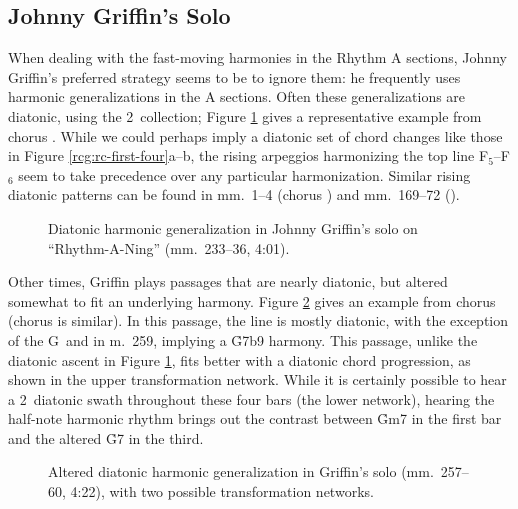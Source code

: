 \subsection{Johnny Griffin’s Solo}
\FloatBarrier

When dealing with the fast-moving harmonies in the Rhythm A sections, Johnny
Griffin's preferred strategy seems to be to ignore them: he frequently uses
harmonic generalizations in the A sections. Often these generalizations are
diatonic, using the 2\flat\ collection; Figure \ref{ran:jg-diatonic-gen} gives
a representative example from chorus . While we could perhaps imply
a diatonic set of chord changes like those in Figure
\ref{rcg:rc-first-four}a--b, the rising arpeggios harmonizing the top line
F$_5$--F$_6$ seem to take precedence over any particular harmonization.
Similar rising diatonic patterns can be found in mm.~1--4 (chorus )
and mm.~169--72 ().

\begin{figure}[tbp]
  \caption[Diatonic harmonic generalization in Johnny Griffin's solo on
    ``Rhythm-A-Ning.'']{Diatonic harmonic generalization in Johnny Griffin's
    solo on ``Rhythm-A-Ning'' (mm.~233--36, 4:01).}
  \label{ran:jg-diatonic-gen}
\end{figure}

Other times, Griffin plays passages that are nearly diatonic, but altered
somewhat to fit an underlying harmony. Figure \ref{ran:jg-diatonic-alt} gives
an example from chorus  (chorus  is similar). In this
passage, the line is mostly diatonic, with the exception of the G\nat\ and
\Aflat in m.~259, implying a \h{G7b9} harmony. This passage, unlike the
diatonic ascent in Figure \ref{ran:jg-diatonic-gen}, fits better with a
diatonic chord progression, as shown in the upper transformation network.
While it is certainly possible to hear a 2\flat\ diatonic swath throughout
these four bars (the lower network), hearing the half-note harmonic rhythm
brings out the contrast between \h{Gm7} in the first bar and the altered
\h{G7} in the third.

\begin{figure}[tbp]
  \caption[Altered diatonic harmonic generalization Griffin's solo.]{%
    Altered diatonic harmonic generalization in Griffin's solo (mm.~257--60,
    4:22), with two possible transformation networks.}
  \label{ran:jg-diatonic-alt}
\end{figure}

